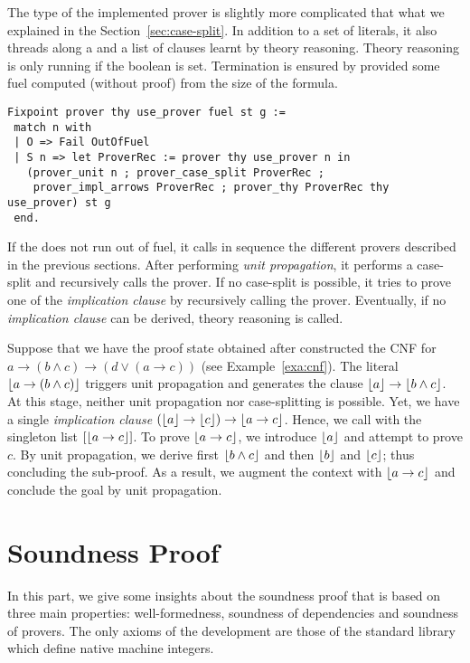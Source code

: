 \documentclass[utf8,a4paper,UKenglish,cleveref, autoref, thm-restate]{lipics-v2021}
\begin{document}
The type of the implemented prover is slightly more complicated that what we explained in the Section~\ref{sec:case-split}.
In addition to a set of literals, it also threads along a  and a list of clauses learnt by theory reasoning.
Theory reasoning is only running if the boolean  is set.
%
Termination is ensured by provided some fuel computed (without proof) from the size of
the formula. 
\begin{verbatim}
Fixpoint prover thy use_prover fuel st g :=
 match n with
 | O => Fail OutOfFuel
 | S n => let ProverRec := prover thy use_prover n in
   (prover_unit n ; prover_case_split ProverRec ;
    prover_impl_arrows ProverRec ; prover_thy ProverRec thy use_prover) st g
 end.
\end{verbatim}
If the  does not run out of fuel, it calls in sequence
the different provers described in the previous sections.  After
performing \emph{unit propagation}, it performs a case-split and
recursively calls the prover. If no case-split is possible, it tries
to prove one of the \emph{implication clause} by recursively calling
the prover. Eventually, if no \emph{implication clause} can be
derived, theory reasoning is called.

  
\begin{example}
  Suppose that we have the proof state obtained after constructed the
  CNF for $a \to (b \wedge c) \to (d \lor (a \to c))$ (see
  Example~\ref{exa:cnf}).  The literal $\lfloor a \to (b \land c) \rfloor$
  triggers unit propagation and generates the clause
  $\lfloor a \rfloor \to \lfloor b \land c \rfloor$. At this stage, neither
  unit propagation nor case-splitting is possible.  Yet, we have a
  single \emph{implication clause}
  $(\lfloor a \rfloor \to \lfloor c \rfloor) \to \lfloor a \to c \rfloor$.  Hence, we call
   with the singleton list $[\lfloor a \to c \rfloor]$.  To
  prove $\lfloor a \to c \rfloor$, we introduce $\lfloor a \rfloor$ and attempt to prove
  $c$.  By unit propagation, we derive first $\lfloor b\land c \rfloor$
  and then $\lfloor b \rfloor$ and $\lfloor c \rfloor$; thus concluding the sub-proof.  As
  a result, we augment the context with $\lfloor a \to c \rfloor$ and conclude
  the goal by unit propagation.
\end{example}

\section{Soundness Proof}
\label{sec:soundness-proof}

In this part, we give some insights about the soundness proof that is
based on three main properties: well-formedness, soundness of
dependencies and soundness of provers.
%
The only axioms of the development are those of the  standard library 
which define native machine integers.
\end{document}
